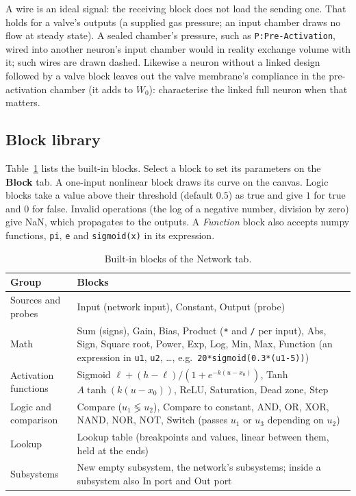 \documentclass[11pt,a4paper]{article}
\newcommand{\code}[1]{\texttt{#1}}
\newcommand{\menu}[1]{\textsf{\textbf{#1}}}
\begin{document}
\begin{warn}
A wire is an ideal signal: the receiving block does not load the sending one. That holds for a valve's outputs
(a supplied gas pressure; an input chamber draws no flow at steady state). A sealed chamber's pressure, such as
\code{P:Pre-Activation}, wired into another neuron's input chamber would in reality exchange volume with it; such
wires are drawn dashed. Likewise a neuron without a linked design followed by a valve block leaves out the valve
membrane's compliance in the pre-activation chamber (it adds to $W_0$): characterise the linked full neuron when that
matters.
\end{warn}

\subsection*{Block library}
Table~\ref{tab:blocks} lists the built-in blocks. Select a block to set its parameters on the \menu{Block} tab. A
one-input nonlinear block draws its curve on the canvas. Logic blocks take a value above their threshold (default
$0.5$) as true and give $1$ for true and $0$ for false. Invalid operations (the log of a negative number, division
by zero) give NaN, which propagates to the outputs. A \emph{Function} block also accepts numpy functions,
\code{pi}, \code{e} and \code{sigmoid(x)} in its expression.

\begin{table}[h]
\centering\small
\begin{tabularx}{\textwidth}{@{}lX@{}}
\toprule
Group & Blocks \\
\midrule
Sources and probes & Input (network input), Constant, Output (probe) \\
Math & Sum (signs), Gain, Bias, Product (\code{*} and \code{/} per input), Abs, Sign, Square root, Power, Exp, Log,
  Min, Max, Function (an expression in \code{u1}, \code{u2}, \ldots, e.g.\ \code{20*sigmoid(0.3*(u1-5))}) \\
Activation functions & Sigmoid $\ell + (h-\ell)/(1+e^{-k(u-x_0)})$, Tanh $A\tanh(k(u-x_0))$, ReLU, Saturation,
  Dead zone, Step \\
Logic and comparison & Compare ($u_1 \lessgtr u_2$), Compare to constant, AND, OR, XOR, NAND, NOR, NOT, Switch
  (passes $u_1$ or $u_3$ depending on $u_2$) \\
Lookup & Lookup table (breakpoints and values, linear between them, held at the ends) \\
Subsystems & New empty subsystem, the network's subsystems; inside a subsystem also In port and Out port \\
\bottomrule
\end{tabularx}
\caption{Built-in blocks of the Network tab.}
\label{tab:blocks}
\end{table}
\end{document}
